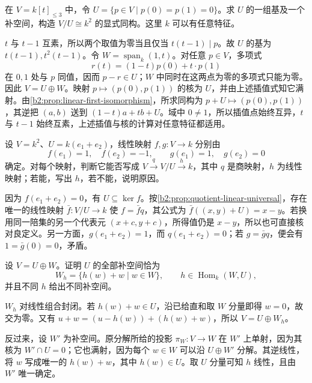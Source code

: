 \begin{exercise}\label{b2:ex:01-evaluation-quotient}
	在 \(V=k[t]_{\le3}\) 中，令 \(U=\{p\in V\mid p(0)=p(1)=0\}\)。求 \(U\) 的一组基及一个补空间，构造 \(V/U\cong k^2\) 的显式同构。这里 \(k\) 可以有任意特征。
\end{exercise}
\begin{solution}
	\(t\) 与 \(t-1\) 互素，所以两个取值为零当且仅当 \(t(t-1)\mid p\)。故 \(U\) 的基为 \(t(t-1),t^2(t-1)\)。令 \(W=\operatorname{span}_k(1,t)\)。对任意 \(p\in V\)，多项式
	\[
		r(t)=(1-t)p(0)+t\cdot p(1)
	\]
	在 \(0,1\) 处与 \(p\) 同值，因而 \(p-r\in U\)；\(W\) 中同时在这两点为零的多项式只能为零。因此 \(V=U\oplus W\)。映射 \(p\mapsto(p(0),p(1))\) 的核为 \(U\)，并由上述插值式知它满射。由\cref{b2:prop:linear-first-isomorphism}，所求同构为 \(p+U\mapsto(p(0),p(1))\)，其逆把 \((a,b)\) 送到 \((1-t)a+tb+U\)。域中 \(0\ne1\)，所以插值点始终互异，\(t\) 与 \(t-1\) 始终互素，上述插值与核的计算对任意特征都适用。
\end{solution}

\begin{exercise}\label{b2:ex:01-quotient-map-test}
	设 \(V=k^2\)、\(U=k(e_1+e_2)\)，线性映射 \(f,g:V\to k\) 分别由
	\[
		f(e_1)=1,\quad f(e_2)=-1,\qquad g(e_1)=1,\quad g(e_2)=0
	\]
	确定。对每个映射，判断它能否写成 \(V\xrightarrow{q}V/U\xrightarrow{h}k\)，其中 \(q\) 是商映射，\(h\) 为线性映射；若能，写出 \(h\)，若不能，说明原因。
\end{exercise}
\begin{solution}
	因为 \(f(e_1+e_2)=0\)，有 \(U\subseteq\ker f\)。按\cref{b2:prop:quotient-linear-universal}，存在唯一的线性映射 \(\bar f:V/U\to k\) 使 \(f=\bar f q\)，其公式为 \(\bar f((x,y)+U)=x-y\)。若换用同一陪集的另一个代表元 \((x+c,y+c)\)，所得值仍是 \(x-y\)，所以也可直接核对良定义。另一方面，\(g(e_1+e_2)=1\)，而 \(q(e_1+e_2)=0\)；若 \(g=\bar gq\)，便会有 \(1=\bar g(0)=0\)，矛盾。
\end{solution}

\begin{exercise}\label{b2:ex:01-complement-graphs}
	设 \(V=U\oplus W\)。证明 \(U\) 的全部补空间恰为
	\[
		W_h=\{h(w)+w\mid w\in W\},\qquad h\in\operatorname{Hom}_k(W,U),
	\]
	并且不同 \(h\) 给出不同补空间。
\end{exercise}
\begin{solution}
	\(W_h\) 对线性组合封闭。若 \(h(w)+w\in U\)，沿已给直和取 \(W\) 分量即得 \(w=0\)，故交为零。又有 \(u+w=(u-h(w))+(h(w)+w)\)，所以 \(V=U\oplus W_h\)。

	反过来，设 \(W'\) 为补空间。原分解所给的投影 \(\pi_W:V\to W\) 在 \(W'\) 上单射，因为其核为 \(W'\cap U=0\)；它也满射，因为每个 \(w\in W\) 可以沿 \(U\oplus W'\) 分解。其逆线性，将 \(w\) 写成唯一的 \(h(w)+w\)，其中 \(h(w)\in U\)。取 \(U\) 分量可知 \(h\) 线性，且由 \(W'\) 唯一确定。
\end{solution}

